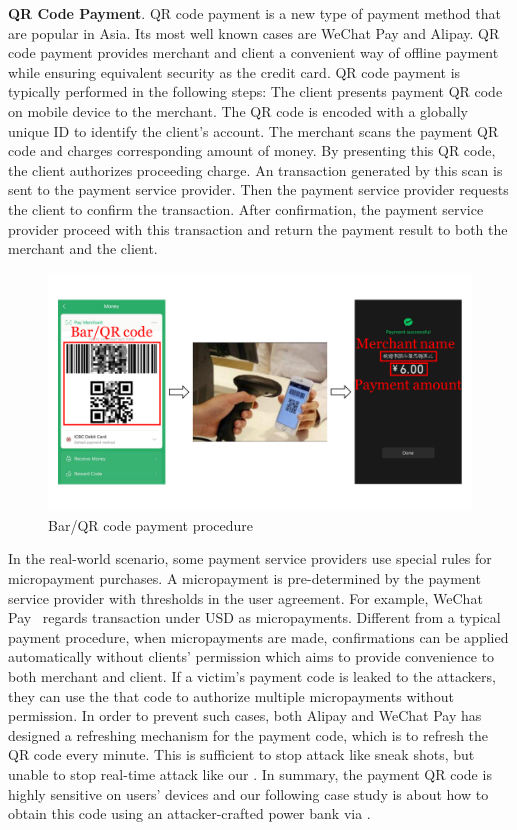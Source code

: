 \textbf{QR Code Payment}.
QR code payment is a new type of payment method that are popular in Asia. Its most well known cases are WeChat Pay and Alipay. QR code payment provides merchant and client a convenient way of offline payment while ensuring equivalent security as the credit card.
QR code payment is typically performed in the following steps:
 The client presents payment QR code on mobile device to the merchant.
The QR code is encoded with a globally unique ID to identify the client's account.
 The merchant scans the payment QR code and charges corresponding amount of money.
By presenting this QR code, the client authorizes proceeding charge.
 An transaction generated by this scan is sent to the payment service provider.
Then the payment service provider requests the client to confirm the transaction.
 After confirmation, the payment service provider proceed with this transaction and return the payment result to both the merchant and the client.

\begin{figure}[t]
	\centering
	\includegraphics[width=\linewidth]{./Figs/qr_code_payment.png}
	\caption{Bar/QR code payment procedure}
	\label{fig:qr_payment_procedure}
\end{figure}


In the real-world scenario, some payment service providers use special rules
for micropayment purchases.  A micropayment is pre-determined by the payment
service provider with thresholds in the user agreement.  For example, WeChat
Pay~\cite{Wechat-pay} regards transaction under USD  as
micropayments.  Different from a typical payment procedure, when micropayments
are made, confirmations can be applied automatically without clients'
permission which aims to provide convenience to both merchant and client.  If a
victim's payment code is leaked to the attackers, they can use the that code to
authorize multiple micropayments without permission.  In order to prevent such
cases, both Alipay and WeChat Pay has designed a refreshing mechanism for the
payment code, which is to refresh the QR code every minute. This is sufficient
to stop attack like sneak shots, but unable to stop real-time attack like our
\tool.  In summary, the payment QR code is highly sensitive on users' devices
and our following case study is about how to obtain this code using an
attacker-crafted power bank via \tool.

